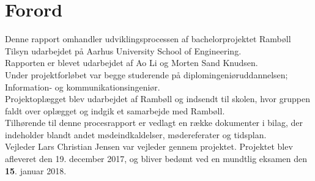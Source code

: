 \chapter*{Forord}
Denne rapport omhandler udviklingsprocessen af bachelorprojektet Rambøll Tilsyn udarbejdet på Aarhus University School of Engineering. \\
Rapporten er blevet udarbejdet af Ao Li og Morten Sand Knudsen. \\ 
Under projektforløbet var begge studerende på diplomingeniøruddannelsen; Information- og kommunikationsingeniør. \\
Projektoplægget blev udarbejdet af Rambøll og indsendt til skolen, hvor gruppen faldt over oplægget og indgik et samarbejde med Rambøll. \\
Tilhørende til denne procesrapport er vedlagt en række dokumenter i bilag, der indeholder blandt andet mødeindkaldelser,
mødereferater og tidsplan. \\

Vejleder Lars Christian Jensen var vejleder gennem projektet. Projektet blev afleveret den 19.
december 2017, og bliver bedømt ved en mundtlig eksamen den \textbf{15}. januar 2018.